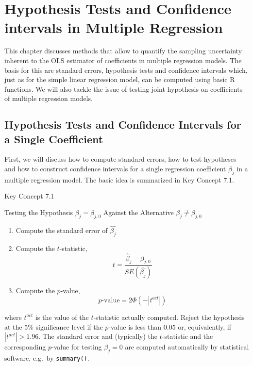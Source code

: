 \documentclass[]{book}
\providecommand{\tightlist}{%
  \setlength{\itemsep}{0pt}\setlength{\parskip}{0pt}}
\theoremstyle{definition}
\theoremstyle{definition}
\theoremstyle{definition}
\theoremstyle{remark}
\begin{document}
\hypertarget{1725e5319c9ff}{}

\chapter{Hypothesis Tests and Confidence intervals in Multiple
Regression}\label{hypothesis-tests-and-confidence-intervals-in-multiple-regression}

This chapter discusses methods that allow to quantify the sampling
uncertainty inherent to the OLS estimator of coefficients in multiple
regression models. The basis for this are standard errors, hypothesis
tests and confidence intervals which, just as for the simple linear
regression model, can be computed using basic R functions. We will also
tackle the issue of testing joint hypothesis on coefficients of multiple
regression models.

\section{Hypothesis Tests and Confidence Intervals for a Single
Coefficient}\label{hypothesis-tests-and-confidence-intervals-for-a-single-coefficient}

First, we will discuss how to compute standard errors, how to test
hypotheses and how to construct confidence intervals for a single
regression coefficient \(\beta_j\) in a multiple regression model. The
basic idea is summarized in Key Concept 7.1.

Key Concept 7.1

Testing the Hypothesis \(\beta_j = \beta_{j,0}\) Against the Alternative
\(\beta_j \neq \beta_{j,0}\)

\begin{enumerate}
\def\labelenumi{\arabic{enumi}.}
\tightlist
\item
  Compute the standard error of \(\hat{\beta_j}\)
\item
  Compute the \(t\)-statistic,
  \[t = \frac{\hat{\beta}_j - \beta_{j,0}} {SE(\hat{\beta_j})}\]
\item
  Compute the \(p\)-value, \[p\text{-value} = 2 \Phi(-|t^{act}|)\]
\end{enumerate}

where \(t^{act}\) is the value of the \(t\)-statistic actually computed.
Reject the hypothesis at the 5\% significance level if the \(p\)-value
is less than \(0.05\) or, equivalently, if \(|t^{act}| > 1.96\). The
standard error and (typically) the \(t\)-statistic and the corresponding
\(p\)-value for testing \(\beta_j = 0\) are computed automatically by
statistical software, e.g.~by \texttt{summary()}.
\end{document}
